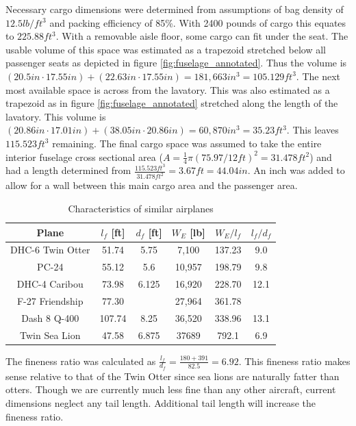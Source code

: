 \documentclass[conf]{new-aiaa}
\begin{document}
Necessary cargo dimensions were determined from assumptions of bag density of $12.5 lb/ft^3$ and packing efficiency of 85\%. With 2400 pounds of cargo this equates to $225.88 ft^3$. With a removable aisle floor, some cargo can fit under the seat.  The usable volume of this space was estimated as a trapezoid stretched below all passenger seats as depicted in figure \ref{fig:fuselage_annotated}. Thus the volume is $(20.5in\cdot 17.55in)+(22.63in\cdot 17.55in)=181,663in^3=105.129ft^3$. The next most available space is across from the lavatory. This was also estimated as a trapezoid as in figure \ref{fig:fuselage_annotated} stretched along the length of the lavatory. This volume is $(20.86in\cdot 17.01in)+(38.05in\cdot 20.86in)=60,870in^3=35.23ft^3$. This leaves $115.523ft^3$ remaining. The final cargo space was assumed to take the entire interior fuselage cross sectional area ($A=\frac{1}{4}\pi(75.97/12ft)^2=31.478ft^2$) and had a length determined from $\frac{115.523ft^3}{31.478ft^2}=3.67 ft = 44.04 in$. An inch was added to allow for a wall between this main cargo area and the passenger area. 

\begin{table}[H]
\centering
\caption{Characteristics of similar airplanes}
\label{tab:similarplanes}
\begin{tabular}{|c|c|c|c|c|c|} \hline
Plane & $l_f$ [ft] & $d_f$ [ft] & $W_E$ [lb] & $W_E/l_f$ & $l_f/d_f$\\ \hline
 DHC-6 Twin Otter & 51.74 & 5.75& 7,100  & 137.23 & 9.0 \\ \hline
 PC-24            & 55.12 & 5.6	& 10,957 & 198.79 & 9.8\\ \hline
 DHC-4 Caribou    & 73.98 & 6.125	& 16,920 & 228.70 & 12.1 \\ \hline
 F-27 Friendship  & 77.30 & 	& 27,964 & 361.78 & \\ \hline
 Dash 8 Q-400     & 107.74 & 8.25	& 36,520 & 338.96 & 13.1\\ \hline
 Twin Sea Lion	& 47.58 & 6.875 &  37689 & 	792.1	  & 6.9 \\ \hline
\end{tabular}
\end{table}

The fineness ratio was calculated as $\frac{l_f}{d_f}=\frac{180+391}{82.5}=6.92$. This fineness ratio makes sense relative to that of the Twin Otter since sea lions are naturally fatter than otters. Though we are currently much less fine than any other aircraft, current dimensions neglect any tail length. Additional tail length will increase the fineness ratio.
\end{document}
